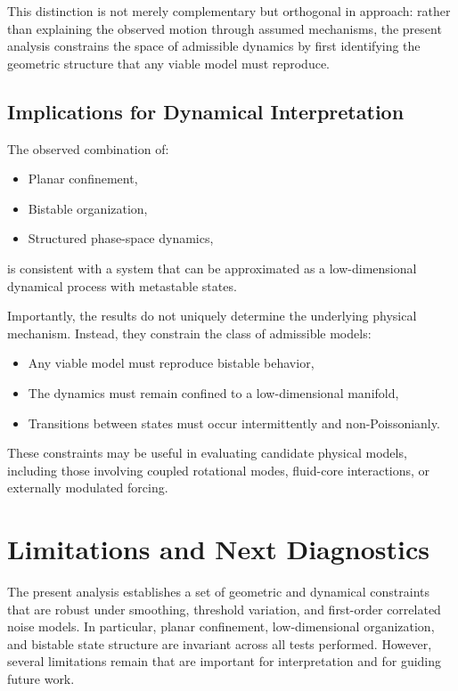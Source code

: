 \documentclass[twocolumn,9pt]{revtex4-2}
\begin{document}
This distinction is not merely complementary but orthogonal in approach: rather than explaining the observed motion through assumed mechanisms, the present analysis constrains the space of admissible dynamics by first identifying the geometric structure that any viable model must reproduce.

\subsection{Implications for Dynamical Interpretation}
\label{subsec:implications_for_dynamical_interpretation}

The observed combination of:

\begin{itemize}
    \item Planar confinement,
    \item Bistable organization,
    \item Structured phase-space dynamics,
\end{itemize}

is consistent with a system that can be approximated as a low-dimensional dynamical process with metastable states.

Importantly, the results do not uniquely determine the underlying physical mechanism. Instead, they constrain the class of admissible models:

\begin{itemize}
    \item Any viable model must reproduce bistable behavior,
    \item The dynamics must remain confined to a low-dimensional manifold,
    \item Transitions between states must occur intermittently and non-Poissonianly.
\end{itemize}

These constraints may be useful in evaluating candidate physical models, including those involving coupled rotational modes, fluid-core interactions, or externally modulated forcing.

\section{Limitations and Next Diagnostics}
\label{sec:limitations}

The present analysis establishes a set of geometric and dynamical constraints that are robust under
smoothing, threshold variation, and first-order correlated noise models. In particular, planar
confinement, low-dimensional organization, and bistable state structure are invariant across all
tests performed. However, several limitations remain that are important for interpretation and for
guiding future work.
\end{document}
